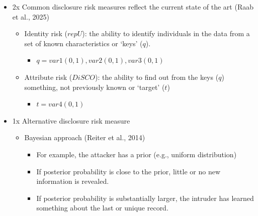 \documentclass[t,8pt,utfx8]{beamer}
\begin{document}
\begin{spacing}{1.25}
\begin{frame}[t]
\begin{itemize}
    \item 2x Common disclosure risk measures reflect the current state of the art  (Raab et al., 2025)
    \begin{itemize}
        \item Identity risk ($repU$): the ability to identify individuals in the data from a set of known characteristics or `keys' ($q$).  
        \begin{itemize}
            \item  $q=var1(0,1), var2(0,1), var3(0,1)$ 
        \end{itemize}
        \item Attribute risk ($DiSCO$): the ability to find out from the keys ($q$) something, not previously known or `target' ($t$)
        \begin{itemize}
            \item $t=var4(0,1)$
        \end{itemize}
    \end{itemize}
    \item 1x Alternative disclosure risk measure
    \begin{itemize}
        \item Bayesian approach (Reiter et al., 2014)
        \begin{itemize}
            \item For example, the attacker has a prior (e.g., uniform distribution)
            \item If posterior probability is close to the prior, little or no new information is revealed.  
            \item If posterior probability is substantially larger, the intruder has learned something about the last or unique record.  
        \end{itemize}
    \end{itemize}
\end{itemize}
\end{frame}


\end{spacing}
\end{document}
